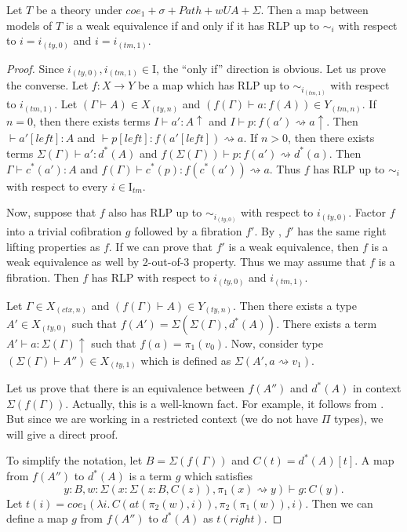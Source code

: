\documentclass{mscs}
\newcommand{\idtype}{\rightsquigarrow}
\newcommand{\I}{\mathrm{I}}
\numberwithin{figure}{section}
\begin{document}
\begin{prop}[sigma-we-i]
Let $T$ be a theory under $coe_1 + \sigma + Path + wUA + \Sigma$.
Then a map between models of $T$ is a weak equivalence if and only if it has RLP up to $\sim_i$ with respect to $i = i_{(ty,0)}$ and $i = i_{(tm,1)}$.
\end{prop}
\begin{proof}
Since $i_{(ty,0)},i_{(tm,1)} \in \I$, the ``only if'' direction is obvious.
Let us prove the converse.
Let $f : X \to Y$ be a map which has RLP up to $\sim_{i_{(tm,1)}}$ with respect to $i_{(tm,1)}$.
Let $(\Gamma \vdash A) \in X_{(ty,n)}$ and $(f(\Gamma) \vdash a : f(A)) \in Y_{(tm,n)}$.
If $n = 0$, then there exists terms $I \vdash a' : A\!\uparrow$ and $I \vdash p : f(a') \idtype a\!\uparrow$.
Then $\vdash a'[left] : A$ and $\vdash p[left] : f(a'[left]) \idtype a$.
If $n > 0$, then there exists terms $\Sigma(\Gamma) \vdash a' : d^*(A)$ and $f(\Sigma(\Gamma)) \vdash p : f(a') \idtype d^*(a)$.
Then $\Gamma \vdash c^*(a') : A$ and $f(\Gamma) \vdash c^*(p) : f(c^*(a')) \idtype a$.
Thus $f$ has RLP up to $\sim_i$ with respect to every $i \in \I_{tm}$.

Now, suppose that $f$ also has RLP up to $\sim_{i_{(ty,0)}}$ with respect to $i_{(ty,0)}$.
Factor $f$ into a trivial cofibration $g$ followed by a fibration $f'$.
By \cite[lemma~3.4]{f-model-structures}, $f'$ has the same right lifting properties as $f$.
If we can prove that $f'$ is a weak equivalence, then $f$ is a weak equivalence as well by 2-out-of-3 property.
Thus we may assume that $f$ is a fibration.
Then $f$ has RLP with respect to $i_{(ty,0)}$ and $i_{(tm,1)}$.

Let $\Gamma \in X_{(ctx,n)}$ and $(f(\Gamma) \vdash A) \in Y_{(ty,n)}$.
Then there exists a type $A' \in X_{(ty,0)}$ such that $f(A') = \Sigma(\Sigma(\Gamma),d^*(A))$.
There exists a term $A' \vdash a : \Sigma(\Gamma)\!\uparrow$ such that $f(a) = \pi_1(v_0)$.
Now, consider type $(\Sigma(\Gamma) \vdash A'') \in X_{(ty,1)}$ which is defined as $\Sigma(A', a \idtype v_1)$.

Let us prove that there is an equivalence between $f(A'')$ and $d^*(A)$ in context $\Sigma(f(\Gamma))$.
Actually, this is a well-known fact.
For example, it follows from \cite[lemmas 3.11.8 and 3.11.9]{hottbook}.
But since we are working in a restricted context (we do not have $\Pi$ types), we will give a direct proof.

To simplify the notation, let $B = \Sigma(f(\Gamma))$ and $C(t) = d^*(A)[t]$.
A map from $f(A'')$ to $d^*(A)$ is a term $g$ which satisfies
\[ y : B, w : \Sigma(x : \Sigma(z : B, C(z)), \pi_1(x) \idtype y) \vdash g : C(y). \]
Let $t(i) = coe_1(\lambda i.\,C(at(\pi_2(w),i)), \pi_2(\pi_1(w)), i)$.
Then we can define a map $g$ from $f(A'')$ to $d^*(A)$ as $t(right)$.


\end{proof}
\end{document}
